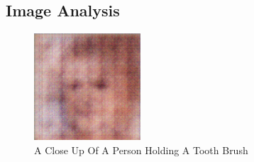 \documentclass{article}%
\begin{document}
%
\subsection{Image Analysis}%
\label{subsec:ImageAnalysis}%


\begin{figure}[h!]%
\centering%
\includegraphics[width=150px]{500_fake_images/samples_5_200.png}%
\caption{A Close Up Of A Person Holding A Tooth Brush}%
\end{figure}

%
\end{document}
